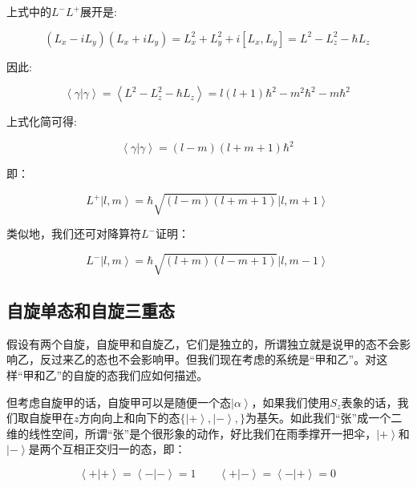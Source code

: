 上式中的$L^- L^+$展开是:

\begin{equation}
(L_x-iL_y) (L_x + i L_y) = L_x^2 + L_y^2 +i [L_x, L_y] = L^2 - L_z^2
- \hbar L_z~
\end{equation}

因此:

\begin{equation}
\left\langle \gamma | \gamma \right\rangle = \left\langle L^2 -
L_z^2 - \hbar L_z \right\rangle = l(l+1)\hbar^2 - m^2\hbar^2 -m
\hbar^2~
\end{equation}

上式化简可得:

\begin{equation}
\left\langle \gamma | \gamma \right\rangle =  (l - m)(l+m+1)\hbar^2~
\end{equation}

即：

\begin{equation}
L^+  \left| l, m \right\rangle = \hbar \sqrt{(l - m)(l + m +1) } \left|l, m + 1 \right\rangle~
\end{equation}

类似地，我们还可对降算符$L^-$证明：

\begin{equation}
L^-  \left| l, m \right\rangle = \hbar \sqrt{(l + m)(l - m +1) } \left|l, m - 1 \right\rangle~
\end{equation}

\subsection{自旋单态和自旋三重态}

假设有两个自旋，自旋甲和自旋乙，它们是独立的，所谓独立就是说甲的态不会影响乙，反过来乙的态也不会影响甲。但我们现在考虑的系统是“甲和乙”。对这样“甲和乙”的自旋的态我们应如何描述。

但考虑自旋甲的话，自旋甲可以是随便一个态$\left| \alpha \right\rangle$，如果我们使用$S_z$表象的话，我们取自旋甲在$z$方向向上和向下的态$\{ \left| + \right\rangle, \left| - \right\rangle,   \}$为基矢。如此我们“张”成一个二维的线性空间，所谓“张”是个很形象的动作，好比我们在雨季撑开一把伞，$\left| + \right\rangle$和$\left| - \right\rangle$是两个互相正交归一的态，即：

\begin{equation}
\left\langle + | + \right\rangle = \left\langle - | - \right\rangle  = 1 \qquad
\left\langle + | - \right\rangle = \left\langle - | + \right\rangle = 0~
\end{equation}

